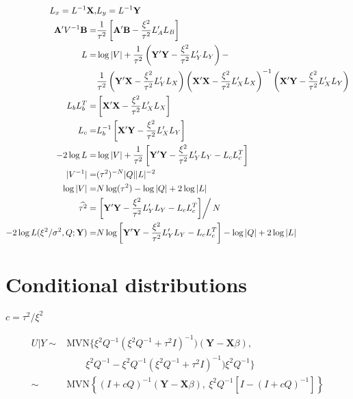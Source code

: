 \documentclass[12pt]{article}
\begin{document}
\begin{align*}
L_x = L^{-1} \mathbf{X}, & L_y = L^{-1}\mathbf{Y}\\
 \mathbf{A}' V^{-1} \mathbf{B}  = &  \frac{1}{\tau^2} \left[ \mathbf{A}' \mathbf{B} - \frac{\xi^2 }{\tau^2}  L_A' L_B \right] \\
 L=&  \log| V| + \frac{1}{\tau^2}\left( \mathbf{Y}' \mathbf{Y} - \frac{\xi^2 }{\tau^2}  L_Y' L_Y \right) -\\ 
&\frac{1}{\tau^2} \left( \mathbf{Y}' \mathbf{X} - \frac{\xi^2 }{\tau^2}  L_Y' L_X\right)  
\left(  \mathbf{X}' \mathbf{X} - \frac{\xi^2 }{\tau^2}  L_X' L_X \right)^{-1}
\left( \mathbf{X}' \mathbf{Y} - \frac{\xi^2 }{\tau^2}  L_X' L_Y \right)\\
L_b L_b^T = &\left[  \mathbf{X}' \mathbf{X} - \frac{\xi^2 }{\tau^2} L_X' L_X \right] \\
L_c = & L_b^{-1} \left[  \mathbf{X}' \mathbf{Y} -\frac{\xi^2 }{\tau^2}  L_X' L_Y \right]\\
-2 \log L = & \log| V| +	\frac{1}{\tau^2} \left[\mathbf{Y}' \mathbf{Y}- \frac{\xi^2 }{\tau^2}  L_Y' L_Y-L_c L_c^T\right]   \\
|V^{-1}| = & ( \tau^2 )^{-N} |Q|  |L|^{-2} \\
 \log| V| = & N \log(\tau^2) - \log |Q| + 2 \log |L| \\
 \widehat{\tau^2} =&\left. \left[\mathbf{Y}' \mathbf{Y}- \frac{\xi^2 }{\tau^2}  L_Y' L_Y-L_c L_c^T\right]\right/N \\
-2 \log L (\xi^2/\sigma^2,Q;\mathbf{Y})= &N \log\left[\mathbf{Y}' \mathbf{Y}- \frac{\xi^2 }{\tau^2}  L_Y' L_Y-L_c L_c^T\right]  - \log |Q| + 2 \log |L|
 \end{align*}


\section*{Conditional distributions}

$c = \tau^2/\xi^2$

\begin{align*}
U|Y \sim & \text{MVN}\{\xi^2Q^{-1}(\xi^2 Q^{-1} + \tau^2 I)^{-1})
(\mathbf{Y} - \mathbf{X}\beta), \\
&\qquad
\xi^2Q^{-1}- \xi^2Q^{-1}( \xi^2Q^{-1} + \tau^2 I  )^{-1})\xi^2 Q^{-1} \}\\
\sim &\text{MVN}\left\{  ( I + c Q  )^{-1}  (\mathbf{Y} -
\mathbf{X}\beta),\ \xi^2 Q^{-1}[I- ( I + cQ  )^{-1}	 ] \right\}\\
\end{align*}
\end{document}
